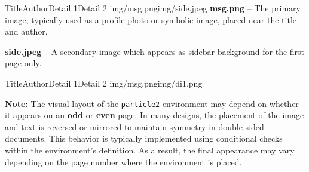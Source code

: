 \documentclass[10pt,twoside]{article}
\begin{document}
{\begin{particle2}{Title}{Author}{Detail 1}{Detail 2} {img/msg.png}{img/side.jpeg}
        \bullet \textbf{msg.png} – The primary image, typically used as a profile photo or symbolic image, placed near the title and author.
        
        \bullet \textbf{side.jpeg} – A secondary image which appears as sidebar  background for the first page only.
        
    \end{particle2}
    
    \begin{particle2}{Title}{Author}{Detail 1}{Detail 2} {img/msg.png}{img/di1.png}
    	
		\textbf{Note:} The visual layout of the \texttt{particle2} environment may depend on whether it appears on an \textbf{odd} or \textbf{even} page. In many designs, the placement of the image and text is reversed or mirrored to maintain symmetry in double-sided documents. This behavior is typically implemented using conditional checks within the environment's definition. As a result, the final appearance may vary depending on the page number where the environment is placed.
    	
    \end{particle2}

         

  	\fancyhf{}
  	\fancyhead[RO]{\textcolor{accent}{\large\textbf{\thepage}}}
  	\fancyhead[LE]{\textcolor{accent}{\large\textbf{\thepage}}}
  	
  	
  	
  	
  	
}
\end{document}
